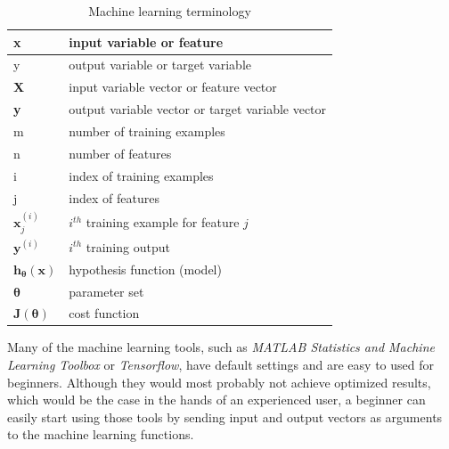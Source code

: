 \begin{table}
\caption{Machine learning terminology}
\label{arm:machineLearningTerminology}
\begin{center}
\begin{tabular}{||l|l||}\hline
x & input variable or feature \\\hline
y & output variable or target variable \\\hline
\textbf{X} & input variable vector or feature vector \\\hline
\textbf{y} & output variable vector or target variable vector \\\hline
m & number of training examples \\\hline
n & number of features \\\hline
i & index of training examples \\\hline
j & index of features \\\hline
$\textbf{x}_j^{(i)}$ & $i^{th}$ training example for feature $j$ \\\hline
$\textbf{y}^{(i)}$ & $i^{th}$ training output  \\\hline
$\textbf{h}_{\bm{\theta}}(\textbf{x})$ &hypothesis function (model)\\\hline
$\bm{\theta}$ &parameter set\\\hline
$\textbf{J}({\bm{\theta}})$ &cost function  \\\hline

\end{tabular}
\end{center}
\end{table}

Many of the machine learning tools, such as \emph{MATLAB Statistics and Machine Learning Toolbox} or \emph{Tensorflow}, have default settings and are easy to used for beginners. 
Although they would most probably not achieve optimized results, which would be the case in the hands of an experienced user, a beginner can easily start using those tools by sending input and output vectors as arguments to the machine learning functions. 

